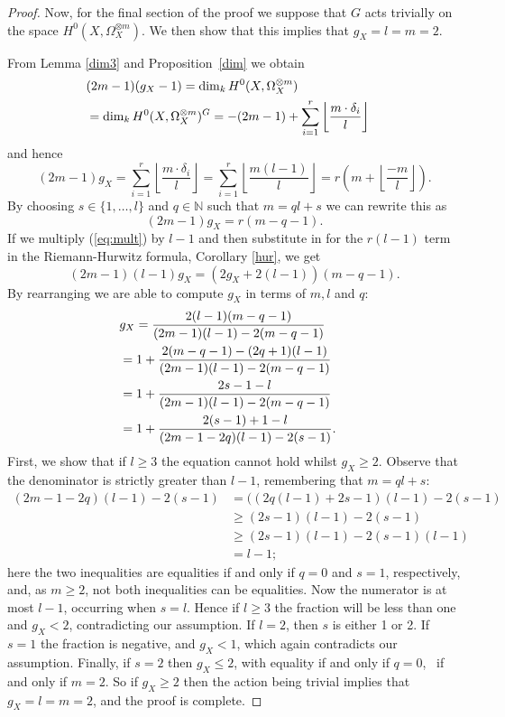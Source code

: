 \begin{proof}
Now, for the final section of the proof we suppose that $G$ acts trivially on the space $H^0(X,\Omega_X^{\otimes m})$.
We then show that this implies that $g_X=l=m=2$.


From Lemma \ref{dim3} and Proposition~\ref{dim} we obtain
\begin{align*}
\lefteqn{(2m-1)(g_X-1)=\dim_kH^0(X,\Omega_X^{\otimes m})} \\
& =  \dim_kH^0(X,\Omega_X^{\otimes m})^G=-(2m-1)+\sum_{i=1}^r \left\lfloor \frac{m\cdot \delta_i}{l} \right\rfloor
\end{align*}
and hence
\begin{equation*}
(2m-1)g_X = \sum_{i=1}^r \left\lfloor \frac{m\cdot \delta_i}{l} \right\rfloor
= \sum_{i=1}^r \left\lfloor \frac{m(l-1)}{l} \right\rfloor
= r\left( m+\left\lfloor \frac{-m}{l} \right\rfloor \right).
\end{equation*}
By choosing $s\in \{1,\ldots ,l\}$ and $q\in \mathbb{N}$ such that $m=ql+s$ we can rewrite this as
\begin{equation}\label{eq:mult}
(2m-1)g_X=r(m-q-1).
\end{equation}
If we multiply (\ref{eq:mult}) by $l-1$ and then substitute in for the $r(l-1)$ term in the Riemann-Hurwitz formula, Corollary \ref{hur}, we get
\begin{equation*}
(2m-1)(l-1)g_X=(2g_X+2(l-1))(m-q-1).
\end{equation*}
By rearranging we are able to compute $g_X$ in terms of $m,l$ and $q$:
\begin{align*}
\lefteqn{g_X = \frac{2(l-1)(m-q-1)}{(2m-1)(l-1)-2(m-q-1)}} \\
& =  1 + \frac{2(m-q-1)-(2q+1)(l-1)}{(2m-1)(l-1)-2(m-q-1)} \\
& =  1 + \frac{2s-1-l}{(2m-1)(l-1)-2(m-q-1)}  \\
& =  1 + \frac{2(s-1)+1-l}{(2m-1-2q)(l-1)-2(s-1)}. 
\end{align*}
First, we show that if $l\geq 3$ the equation cannot hold whilst $g_X\geq 2$.
Observe that the denominator is strictly greater than $l-1$, remembering that $m=ql+s$:
\begin{align*}
(2m-1-2q)(l-1)-2(s-1) & =  ((2q(l-1)+2s-1)(l-1)-2(s-1) \\
& \geq  (2s-1)(l-1)-2(s-1) \\
& \geq  (2s-1)(l-1)-2(s-1)(l-1) \\
& =  l-1;
\end{align*}
here the two inequalities are equalities if and only if $q=0$ and $s=1$, respectively, and, as $m\geq 2$, not both inequalities can be equalities.
Now the numerator is at most $l-1$, occurring when $s=l$. 
Hence if $l\geq 3$ the fraction will be less than one and $g_X < 2$, contradicting our assumption.
If $l=2$, then $s$ is either 1 or 2.
If $s=1$ the fraction is negative, and $g_X<1$, which again contradicts our assumption.
Finally, if $s=2$ then $g_X\leq 2$, with equality if and only if $q=0$, \ie~if and only if $m=2$.
So if $g_X \geq 2$ then the action being trivial implies that $g_X=l=m=2$, and the proof is complete.    
\end{proof}

